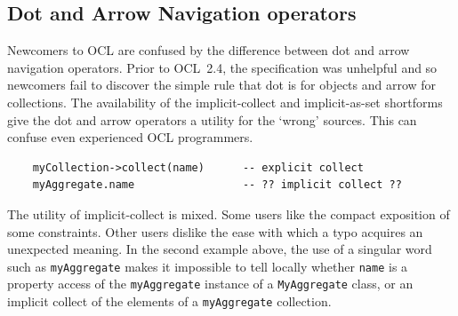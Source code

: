 \documentclass{jot}
\begin{document}


\subsection{Dot and Arrow Navigation operators}

Newcomers to OCL are confused by the difference between dot and arrow navigation operators. Prior to OCL~2.4, the specification was unhelpful and so newcomers fail to discover the simple rule that dot is for objects and arrow for collections. The availability of the implicit-collect and implicit-as-set shortforms give the dot and arrow operators a utility for the `wrong' sources. This can confuse even experienced OCL programmers.

\begin{verbatim}
    myCollection->collect(name)      -- explicit collect
    myAggregate.name                 -- ?? implicit collect ??
\end{verbatim}

The utility of implicit-collect is mixed. Some users like the compact exposition of some constraints. Other users dislike the ease with which a typo acquires an unexpected meaning. In the second example above, the use of a singular word such as \verb$myAggregate$ makes it impossible to tell locally whether \verb$name$ is a property access of the \verb$myAggregate$ instance of a \verb$MyAggregate$ class, or an implicit collect of the elements of a \verb$myAggregate$ collection.
\end{document}
